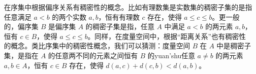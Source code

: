 
在序集中根据偏序关系有稠密性的概念。比如有理数集是实数集的稠密子集的是指任意满足 $a<b$ 的两个实数 $a,b$，恒有有理数 $c$ 存在，使得 $a\leq c\leq b$。更一般的，偏序集 $B$ 是偏序集 $A$ 的稠密子集是指，任意 $A$ 中满足 $a<b$ 的两元素 $a,b$，恒有 $c\in B$，使得 $a\leq c\leq b$。同样，在度量空间中，根据“距离关系”也有稠密性的概念。类比序集中的稠密性概念，我们可以猜测：度量空间 $B$ 在 $A$ 中是稠密子集，是指在 $A$ 的任意两不同的元素之间恒有 $B$ 的yuan'shu任意 $a\neq b$ 的两元素 $a,b\in A$，恒有 $c\in B$ 存在，使得 $d(a,c)+d(c,b)<d(a,b)$。  